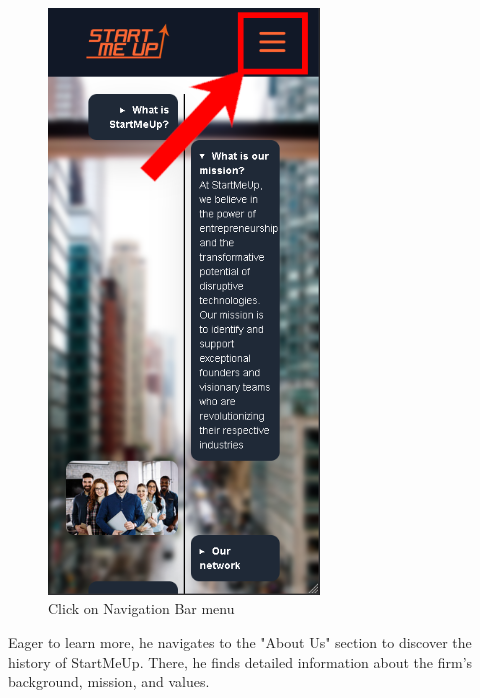 \documentclass[11pt, letterpaper]{article}
\begin{document}
\begin{figure}[H]
\begin{minipage}[b]{0.4\textwidth}
    \includegraphics[width=7.2cm]{images/Scenarios/Scenario4/Screen2.png}
    \caption{Click on Navigation Bar menu}
    \label{fig:scenario4_2}
  \end{minipage}
\end{figure}
\noindent
Eager to learn more, he navigates to the "About Us" section to discover the history of StartMeUp.
There, he finds detailed information about the firm's background, mission, and values.
\end{document}
